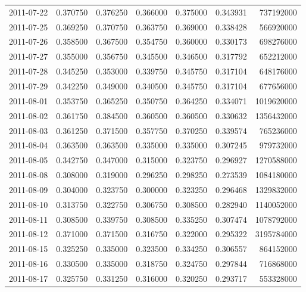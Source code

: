 \begin{tabular}{lrrrrrr}
2011-07-22 &    0.370750 &    0.376250 &    0.366000 &    0.375000 &    0.343931 &   737192000 \\
2011-07-25 &    0.369250 &    0.370750 &    0.363750 &    0.369000 &    0.338428 &   566920000 \\
2011-07-26 &    0.358500 &    0.367500 &    0.354750 &    0.360000 &    0.330173 &   698276000 \\
2011-07-27 &    0.355000 &    0.356750 &    0.345500 &    0.346500 &    0.317792 &   652212000 \\
2011-07-28 &    0.345250 &    0.353000 &    0.339750 &    0.345750 &    0.317104 &   648176000 \\
2011-07-29 &    0.342250 &    0.349000 &    0.340500 &    0.345750 &    0.317104 &   677656000 \\
2011-08-01 &    0.353750 &    0.365250 &    0.350750 &    0.364250 &    0.334071 &  1019620000 \\
2011-08-02 &    0.361750 &    0.384500 &    0.360500 &    0.360500 &    0.330632 &  1356432000 \\
2011-08-03 &    0.361250 &    0.371500 &    0.357750 &    0.370250 &    0.339574 &   765236000 \\
2011-08-04 &    0.363500 &    0.363500 &    0.335000 &    0.335000 &    0.307245 &   979732000 \\
2011-08-05 &    0.342750 &    0.347000 &    0.315000 &    0.323750 &    0.296927 &  1270588000 \\
2011-08-08 &    0.308000 &    0.319000 &    0.296250 &    0.298250 &    0.273539 &  1084180000 \\
2011-08-09 &    0.304000 &    0.323750 &    0.300000 &    0.323250 &    0.296468 &  1329832000 \\
2011-08-10 &    0.313750 &    0.322750 &    0.306750 &    0.308500 &    0.282940 &  1140052000 \\
2011-08-11 &    0.308500 &    0.339750 &    0.308500 &    0.335250 &    0.307474 &  1078792000 \\
2011-08-12 &    0.371000 &    0.371500 &    0.316750 &    0.322000 &    0.295322 &  3195784000 \\
2011-08-15 &    0.325250 &    0.335000 &    0.323500 &    0.334250 &    0.306557 &   864152000 \\
2011-08-16 &    0.330500 &    0.335000 &    0.318750 &    0.324750 &    0.297844 &   716868000 \\
2011-08-17 &    0.325750 &    0.331250 &    0.316000 &    0.320250 &    0.293717 &   553328000 \\

\end{tabular}
